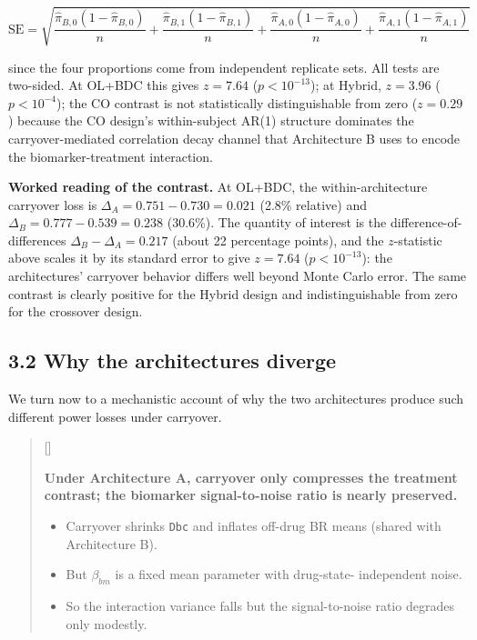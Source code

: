 \documentclass[
  11pt,
]{article}
\newcounter{pgraph}
\newenvironment{bullets}{%
  \stepcounter{pgraph}%
  \begin{quote}\small\sffamily\color[gray]{0.30}%
  {\normalfont\scriptsize\color[gray]{0.58}[\thepgraph]\enspace}}{%
  \end{quote}}
\begin{document}
\[
\text{SE} = \sqrt{
  \frac{\hat{\pi}_{B,0}(1-\hat{\pi}_{B,0})}{n}
+ \frac{\hat{\pi}_{B,1}(1-\hat{\pi}_{B,1})}{n}
+ \frac{\hat{\pi}_{A,0}(1-\hat{\pi}_{A,0})}{n}
+ \frac{\hat{\pi}_{A,1}(1-\hat{\pi}_{A,1})}{n}}
\]

since the four proportions come from independent replicate sets. All
tests are two-sided. At OL+BDC this gives \(z = 7.64\)
(\(p < 10^{-13}\)); at Hybrid, \(z = 3.96\) (\(p < 10^{-4}\)); the CO
contrast is not statistically distinguishable from zero (\(z = 0.29\))
because the CO design's within-subject AR(1) structure dominates the
carryover-mediated correlation decay channel that Architecture B uses to
encode the biomarker-treatment interaction.

\textbf{Worked reading of the contrast.} At OL+BDC, the
within-architecture carryover loss is \(\Delta_A = 0.751 - 0.730 =
0.021\) (2.8\% relative) and \(\Delta_B = 0.777 - 0.539 = 0.238\)
(30.6\%). The quantity of interest is the difference-of-differences
\(\Delta_B - \Delta_A = 0.217\) (about 22 percentage points), and the
\(z\)-statistic above scales it by its standard error to give
\(z = 7.64\) (\(p < 10^{-13}\)): the architectures' carryover behavior
differs well beyond Monte Carlo error. The same contrast is clearly
positive for the Hybrid design and indistinguishable from zero for the
crossover design.

\subsection{3.2 Why the architectures diverge}

We turn now to a mechanistic account of why the two architectures
produce such different power losses under carryover.

\begin{bullets}

\textbf{Under Architecture A, carryover only compresses the
treatment contrast; the biomarker signal-to-noise ratio is nearly
preserved.}

\begin{itemize}\setlength{\itemsep}{2pt}\setlength{\parskip}{0pt}
\item Carryover shrinks \texttt{Dbc} and inflates off-drug BR means
(shared with Architecture B).
\item But $\beta_{bm}$ is a fixed mean parameter with drug-state-
independent noise.
\item So the interaction variance falls but the signal-to-noise
ratio degrades only modestly.
\end{itemize}

\end{bullets}
\end{document}
